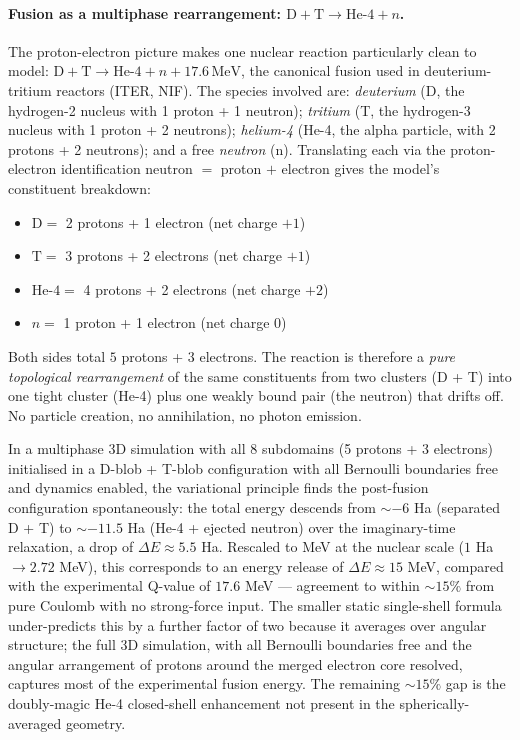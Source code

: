 \documentclass[11pt]{article}
\begin{document}
\paragraph{Fusion as a multiphase rearrangement: $\mathrm{D} + \mathrm{T} \to \mathrm{He}\text{-}4 + n$.}
The proton-electron picture makes one nuclear reaction particularly clean to model: $\mathrm{D} + \mathrm{T} \to \mathrm{He}\text{-}4 + n + 17.6\,\mathrm{MeV}$, the canonical fusion used in deuterium-tritium reactors (ITER, NIF). The species involved are: \emph{deuterium} (D, the hydrogen-2 nucleus with 1 proton + 1 neutron); \emph{tritium} (T, the hydrogen-3 nucleus with 1 proton + 2 neutrons); \emph{helium-4} (He-4, the alpha particle, with 2 protons + 2 neutrons); and a free \emph{neutron} (n). Translating each via the proton-electron identification neutron $=$ proton $+$ electron gives the model's constituent breakdown:
\begin{itemize}
\item $\mathrm{D} = $ 2 protons + 1 electron (net charge $+1$)
\item $\mathrm{T} = $ 3 protons + 2 electrons (net charge $+1$)
\item $\mathrm{He}\text{-}4 = $ 4 protons + 2 electrons (net charge $+2$)
\item $n = $ 1 proton + 1 electron (net charge $0$)
\end{itemize}
Both sides total $5$ protons + $3$ electrons. The reaction is therefore a \emph{pure topological rearrangement} of the same constituents from two clusters (D + T) into one tight cluster (He-4) plus one weakly bound pair (the neutron) that drifts off. No particle creation, no annihilation, no photon emission.

In a multiphase 3D simulation with all $8$ subdomains (5 protons + 3 electrons) initialised in a D-blob + T-blob configuration with all Bernoulli boundaries free and dynamics enabled, the variational principle finds the post-fusion configuration spontaneously: the total energy descends from $\sim -6$ Ha (separated D + T) to $\sim -11.5$ Ha (He-4 + ejected neutron) over the imaginary-time relaxation, a drop of $\Delta E \approx 5.5$ Ha. Rescaled to MeV at the nuclear scale ($1$ Ha $\to 2.72$ MeV), this corresponds to an energy release of $\Delta E \approx 15$ MeV, compared with the experimental Q-value of $17.6$ MeV --- agreement to within $\sim 15\%$ from pure Coulomb with no strong-force input. The smaller static single-shell formula under-predicts this by a further factor of two because it averages over angular structure; the full 3D simulation, with all Bernoulli boundaries free and the angular arrangement of protons around the merged electron core resolved, captures most of the experimental fusion energy. The remaining $\sim 15\%$ gap is the doubly-magic He-4 closed-shell enhancement not present in the spherically-averaged geometry.
\end{document}
